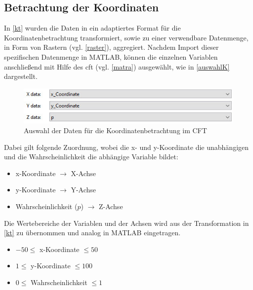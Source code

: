 
\subsection{Betrachtung der Koordinaten}
\label{bk}


In \vref{kt} wurden die Daten in ein adaptiertes Format für die Koordinatenbetrachtung transformiert, sowie zu einer verwendbare Datenmenge, in Form von Rastern (vgl. \vref{raster}), aggregiert. Nachdem Import dieser spezifischen Datenmenge in MATLAB, können die einzelnen Variablen anschließend mit Hilfe des \gls{cft} (vgl. \vref{matra}) ausgewählt, wie in \vref{auswahlK} dargestellt.

\begin{figure}[H]
\centering
\includegraphics[scale=0.8]{se-wa-jpg/auswahlK}
\caption{Auswahl der Daten für die Koordinatenbetrachtung im CFT}
\label{auswahlWD}
\end{figure}

Dabei gilt folgende Zuordnung, wobei die x- und y-Koordinate die unabhängigen und die Wahrscheinlichkeit die abhängige Variable bildet:

\begin{itemize}
\item x-Koordinate $\rightarrow$  X-Achse
\item y-Koordinate $\rightarrow$ Y-Achse
\item Wahrscheinlichkeit ($p$) $\rightarrow$ Z-Achse
\end{itemize}

Die Wertebereiche der Variablen und der Achsen wird aus der Transformation in \vref{kt} zu übernommen und analog in MATLAB eingetragen.

\begin{itemize}
\item $ -50 \le$ x-Koordinate $\le 50$
\item $ 1 \le$ y-Koordinate $\le 100$
\item $ 0 \le$ Wahrscheinlichkeit $\le 1$
\end{itemize}

